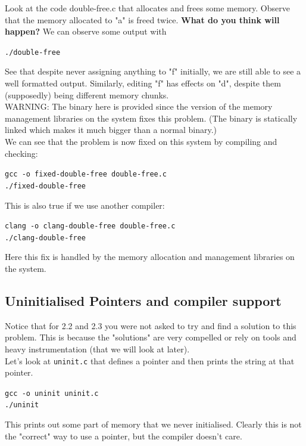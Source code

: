 \documentclass{article}
\begin{document}
\noindent Look at the code double-free.c that allocates and frees some memory. Observe that the memory allocated to "a" is freed twice. \textbf{What do you think will happen?} We can observe some output with
\begin{center}
    \lstinline{./double-free}
\end{center}
\noindent See that despite never assigning anything to "f" initially, we are still able to
see a well formatted output. Similarly, editing "f" has effects on "d", despite
them (supposedly) being different memory chunks.\\


\noindent WARNING: The binary here is provided since the version of the memory management libraries on the system fixes this problem. (The binary is
statically linked which makes it much bigger than a normal binary.)\\


\noindent We can see that the problem is now fixed on this system by compiling and checking:
\begin{center}
    \lstinline{gcc -o fixed-double-free double-free.c}\\
    \lstinline{./fixed-double-free}
\end{center}

\noindent This is also true if we use another compiler:
\begin{center}
    \lstinline{clang -o clang-double-free double-free.c}\\
    \lstinline{./clang-double-free}
\end{center}
\noindent Here this fix is handled by the memory allocation and management libraries on the system.


\subsection{Uninitialised Pointers and compiler support}
Notice that for 2.2 and 2.3 you were not asked to try and find a solution to this problem. This is because the "solutions" are very compelled or rely on tools and heavy instrumentation (that we will look at later).\\

\noindent Let's look at \lstinline{uninit.c} that defines a pointer and then prints the string at
that pointer.
\begin{center}
    \lstinline{gcc -o uninit uninit.c}\\
    \lstinline{./uninit}
\end{center}
\noindent This prints out some part of memory that we never initialised. Clearly this
is not the "correct" way to use a pointer, but the compiler doesn't care.\\
\end{document}
